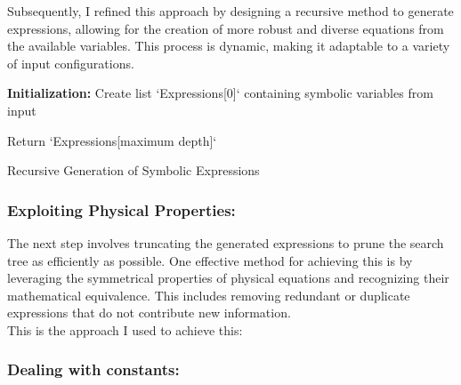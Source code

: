 \documentclass{article}
\begin{document}
Subsequently, I refined this approach by designing a recursive method to generate expressions, allowing for the creation of more robust and diverse equations from the available variables. This process is dynamic, making it adaptable to a variety of input configurations.\\




\begin{algorithm}[H]
\SetAlgoLined
{}

\textbf{Initialization:}\;
Create list `Expressions[0]` containing symbolic variables from input\;


Return `Expressions[maximum depth]`\;

\caption{Recursive Generation of Symbolic Expressions}
\label{alg:recursive_expressions} %
\end{algorithm}


\subsubsection{ Exploiting Physical Properties: }

The next step involves truncating the generated expressions to prune the search tree as efficiently as possible. One effective method for achieving this is by leveraging the symmetrical properties of physical equations and recognizing their mathematical equivalence. This includes removing redundant or duplicate expressions that do not contribute new information.\\

This is the approach I used to achieve this:\\


\subsubsection{Dealing with constants:}
\end{document}
